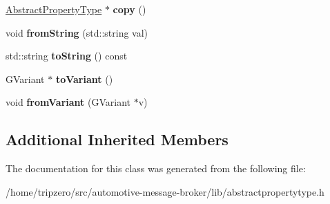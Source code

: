 \begin{DoxyCompactItemize}
\item 
\hypertarget{classBasicPropertyType_a244d19253bfc42dfadd84570b8c8e404}{\hyperlink{classAbstractPropertyType}{Abstract\-Property\-Type} $\ast$ {\bfseries copy} ()}\label{classBasicPropertyType_a244d19253bfc42dfadd84570b8c8e404}

\item 
\hypertarget{classBasicPropertyType_a3c73a6a2c2c020ec327849f318ae9f2a}{void {\bfseries from\-String} (std\-::string val)}\label{classBasicPropertyType_a3c73a6a2c2c020ec327849f318ae9f2a}

\item 
\hypertarget{classBasicPropertyType_a672e2824bcc38da6e60090022fd8d114}{std\-::string {\bfseries to\-String} () const }\label{classBasicPropertyType_a672e2824bcc38da6e60090022fd8d114}

\item 
\hypertarget{classBasicPropertyType_a893a2d1f8fec7141159d850caa78bc06}{G\-Variant $\ast$ {\bfseries to\-Variant} ()}\label{classBasicPropertyType_a893a2d1f8fec7141159d850caa78bc06}

\item 
\hypertarget{classBasicPropertyType_a0e1213ee2df11ecd556b250fe3bad21b}{void {\bfseries from\-Variant} (G\-Variant $\ast$v)}\label{classBasicPropertyType_a0e1213ee2df11ecd556b250fe3bad21b}

\end{DoxyCompactItemize}
\subsection*{Additional Inherited Members}


The documentation for this class was generated from the following file\-:\begin{DoxyCompactItemize}
\item 
/home/tripzero/src/automotive-\/message-\/broker/lib/abstractpropertytype.\-h\end{DoxyCompactItemize}
